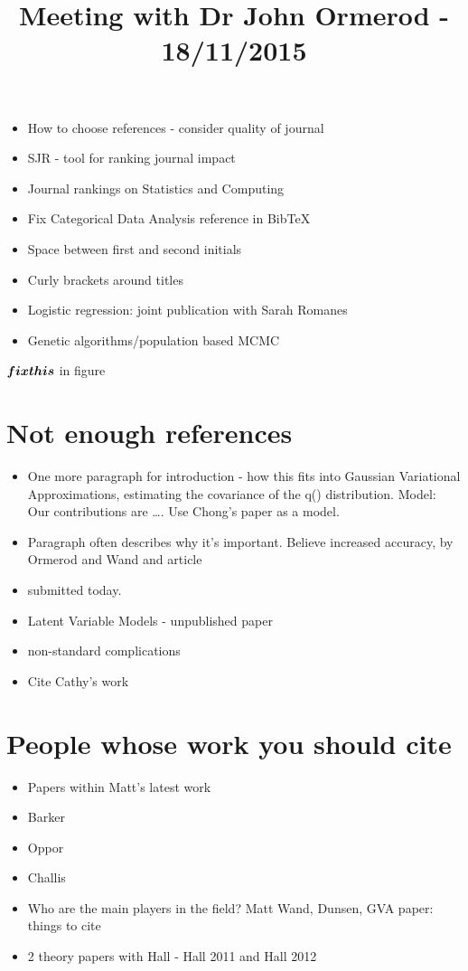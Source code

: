 \documentclass{article}
\title{Meeting with Dr John Ormerod - 18/11/2015}
\begin{document}
\maketitle

\begin{itemize}
\item How to choose references - consider quality of journal
\item SJR - tool for ranking journal impact
\end{itemize}

\begin{itemize}
\item Journal rankings on Statistics and Computing
\item Fix Categorical Data Analysis reference in BibTeX
\item Space between first and second initials
\item Curly brackets around titles
\end{itemize}

\begin{itemize}
\item Logistic regression: joint publication with Sarah Romanes
\item Genetic algorithms/population based MCMC
\end{itemize}

$\boldsymbol{fix this}$ in figure

\section{Not enough references}
\begin{itemize}
\item One more paragraph for introduction - how this fits into Gaussian Variational Approximations, estimating the covariance of the q() distribution. Model: Our contributions are \ldots. Use Chong's paper as a model.
\item Paragraph often describes why it's important. Believe increased accuracy, by Ormerod and Wand and article
\item submitted today.
\item Latent Variable Models - unpublished paper
\item non-standard complications
\item Cite Cathy's work
\end{itemize}

\section{People whose work you should cite}
\begin{itemize}
\item Papers within Matt's latest work
\item Barker
\item Oppor
\item Challis
\item Who are the main players in the field? Matt Wand, Dunsen, GVA paper: things to cite
\item 2 theory papers with Hall - Hall 2011 and Hall 2012
\end{itemize}
\end{document}
